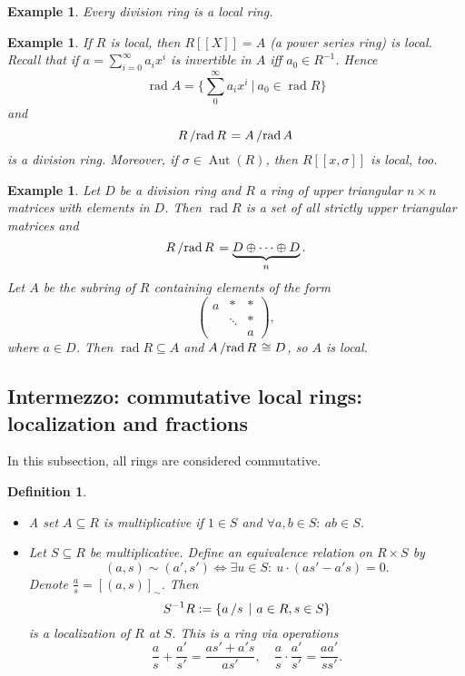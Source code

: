 \documentclass[10pt, a4paper]{article}
\newtheorem{defi}[thm]{Definition}
\newenvironment{noticeB}{%
  \tcolorbox[%
  notitle,
  empty,
  enhanced,  %
  breakable,
  coltext=black,
  colback=white, 
  fontupper=\rmfamily,
  noparskip,
  sharp corners,
  boxrule=-1pt,  %
  frame hidden,
  left=7pt,  %
  right=7pt,
  top=5pt,
  bottom=5pt,
  before skip=2.5ex plus 2pt,
  after skip=2.5ex plus 2pt,
  borderline west = {1.5pt}{-0.1pt}{blue!30!black}, %
  overlay unbroken and last={%
    \draw[color=black, line width=1.25pt]
    ($(frame.south west)+(1.pt, -0.1pt)$) -- ++(2em, 0);
  }
  ]}
{\endtcolorbox}
\newenvironment{definition}{\begin{noticeB}\begin{defi}}{%
    \end{defi}\end{noticeB}}
\newtheorem{example}[thm]{Example}
\newcommand{\quot}[2]{{\raisebox{0em}{$#1$}\left/\raisebox{0em}{$#2$}\right.}}
\DeclareMathOperator{\rad}{rad}
\DeclareMathOperator{\aut}{Aut}
\begin{document}
\begin{example}
    Every division ring is a local ring.
\end{example}    

\begin{example}
  If $R$ is local, then $R[[X]] = A$ (a power series ring) is local.  
  Recall that if $a = \sum_{i = 0} ^\infty a_i x^i$ is invertible in $A$ iff $a_0 \in R^{-1}$.
  Hence $$\rad A = \{\sum_0 ^\infty a_i x^i\ |\ a_0 \in \rad R\}$$
  and $$\quot{R}{\rad R} = \quot{A}{\rad A}$$ is a division ring.
  Moreover, if $\sigma \in \aut (R)$, then $R[[x, \sigma]]$ is local, too.
\end{example}
  
\begin{example}
  Let $D$ be a division ring and $R$ a ring of upper triangular $n \times n$ matrices with elements in $D$.
  Then $\rad R$ is a set of all strictly upper triangular matrices and $$\quot{R}{\rad R} = \underbrace{D \oplus \dots \oplus D}_{n}.$$
  Let $A$ be the subring of $R$ containing elements of the form 
  $$\begin{pmatrix}
    a & * & *\\
     & \ddots & *\\
     & & a
  \end{pmatrix},$$
  where $a \in D$. Then $\rad R \subseteq A$ and $\quot{A}{\rad R} \cong D$, so $A$ is local.
\end{example}

\subsection{Intermezzo: commutative local rings: localization and fractions}

In this subsection, all rings are considered commutative.

\begin{definition}
  \begin{itemize}
    \item A set $A \subseteq R$ is multiplicative if $1 \in S$ and $\forall a, b \in S:\ ab \in S$.
    \item Let $S \subseteq R$ be multiplicative. Define an equivalence relation on $R \times S$ by 
    $$(a, s) \sim (a', s') \Leftrightarrow \exists u \in S:\ u \cdot (as' - a's) = 0.$$
    Denote $\frac{a}{s} = [(a, s)]_{\sim}$. Then 
    $$S^{-1} R := \left\lbrace \quot{a}{s}\ |\ a \in R, s \in S\right\rbrace$$
    is a localization of $R$ at $S$. This is a ring via operations 
    $$\frac{a}{s} + \frac{a'}{s'} = \frac{as' + a' s}{as'},\quad \frac{a}{s} \cdot \frac{a'}{s'} = \frac{aa'}{ss'}.$$
  \end{itemize}
\end{definition}
\end{document}
